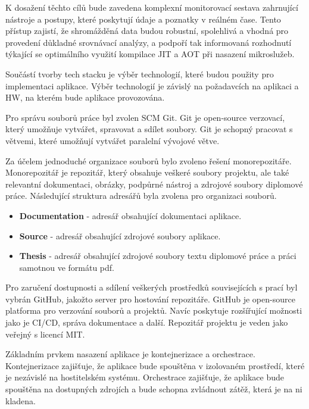 K dosažení těchto cílů bude zavedena komplexní monitorovací sestava zahrnující nástroje a postupy, které poskytují údaje a poznatky v reálném čase. Tento přístup zajistí, že shromážděná data budou robustní, spolehlivá a vhodná pro provedení důkladné srovnávací analýzy, a podpoří tak informovaná rozhodnutí týkající se optimálního využití kompilace JIT a AOT při nasazení mikroslužeb.


Součástí tvorby tech stacku je výběr technologií, které budou použity pro implementaci aplikace. Výběr technologií je závislý na požadavcích na aplikaci a HW, na kterém bude aplikace provozována.


Pro správu souborů práce byl zvolen SCM Git. Git je open-source verzovací, který umožňuje vytvářet, spravovat a sdílet soubory. Git je schopný pracovat s větvemi, které umožňují vytvářet paralelní vývojové větve.

Za účelem jednoduché organizace souborů bylo zvoleno řešení monorepozitáře. Monorepozitář je repozitář, který obsahuje veškeré soubory projektu, ale také relevantní dokumentaci, obrázky, podpůrné nástroj a zdrojové soubory diplomové práce. Následující struktura adresářů byla zvolena pro organizaci souborů.

\begin{itemize}
    \item \textbf{Documentation} - adresář obsahující dokumentaci aplikace.
    \item \textbf{Source} - adresář obsahující zdrojové soubory aplikace.
    \item \textbf{Thesis} - adresář obsahující zdrojové soubory textu diplomové práce a práci samotnou ve formátu pdf.
\end{itemize}

Pro zaručení dostupnosti a sdílení veškerých prostředků souvisejících s prací byl vybrán GitHub, jakožto server pro hostování repozitáře. GitHub je open-source platforma pro verzování souborů a projektů. Navíc poskytuje rozšířující možnosti jako je CI/CD, správa dokumentace a další. Repozitář projektu je veden jako veřejný s licencí MIT.


Základním prvkem nasazení aplikace je kontejnerizace a orchestrace. Kontejnerizace zajišťuje, že aplikace bude spouštěna v izolovaném prostředí, které je nezávislé na hostitelském systému. Orchestrace zajišťuje, že aplikace bude spouštěna na dostupných zdrojích a bude schopna zvládnout zátěž, která je na ni kladena.

